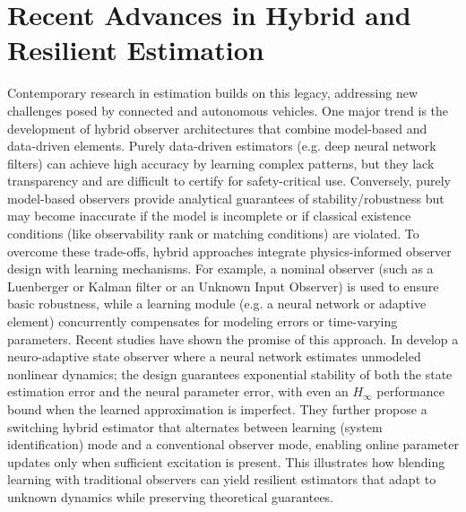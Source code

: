 \section{Recent Advances in Hybrid and Resilient Estimation}
Contemporary research in estimation builds on this legacy, addressing new challenges posed by connected and autonomous vehicles. One major trend is the development of hybrid observer architectures that combine model-based and data-driven elements. Purely data-driven estimators (e.g. deep neural network filters) can achieve high accuracy by learning complex patterns, but they lack transparency and are difficult to certify for safety-critical use. Conversely, purely model-based observers provide analytical guarantees of stability/robustness but may become inaccurate if the model is incomplete or if classical existence conditions (like observability rank or matching conditions) are violated. To overcome these trade-offs, hybrid approaches integrate physics-informed observer design with learning mechanisms. For example, a nominal observer (such as a Luenberger or Kalman filter or an Unknown Input Observer) is used to ensure basic robustness, while a learning module (e.g. a neural network or adaptive element) concurrently compensates for modeling errors or time-varying parameters. Recent studies have shown the promise of this approach. In \cite{JeongNeural} develop a neuro-adaptive state observer where a neural network estimates unmodeled nonlinear dynamics; the design guarantees exponential stability of both the state estimation error and the neural parameter error, with even an $H_\infty$ performance bound when the learned approximation is imperfect. They further propose a switching hybrid estimator that alternates between learning (system identification) mode and a conventional observer mode, enabling online parameter updates only when sufficient excitation is present. This illustrates how blending learning with traditional observers can yield resilient estimators that adapt to unknown dynamics while preserving theoretical guarantees.

